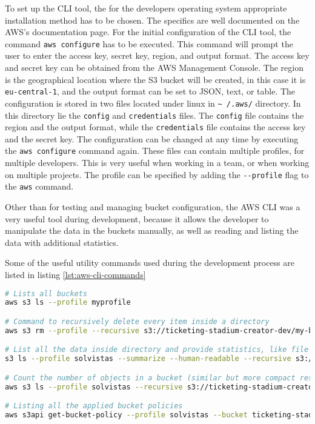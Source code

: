 To set up the CLI tool, the for the developers operating system appropriate installation method has to be chosen. The specifics are well documented on the AWS's documentation page. For the initial configuration of the CLI tool, the command \texttt{aws configure} has to be executed. This command will prompt the user to enter the access key, secret key, region, and output format. The access key and secret key can be obtained from the AWS Management Console. The region is the geographical location where the S3 bucket will be created, in this case it is \texttt{eu-central-1}, and the output format can be set to JSON, text, or table. The configuration is stored in two files located under linux in \texttt{\textasciitilde~/.aws/} directory. In this directory lie the \texttt{config} and \texttt{credentials} files. The \texttt{config} file contains the region and the output format, while the \texttt{credentials} file contains the access key and the secret key. The configuration can be changed at any time by executing the \texttt{aws configure} command again. These files can contain multiple profiles, for multiple developers. This is very useful when working in a team, or when working on multiple projects. The profile can be specified by adding the \texttt{-{}-profile} flag to the \texttt{aws} command. 

Other than for testing and managing bucket configuration, the AWS CLI was a very useful tool during development, because it allows the developer to manipulate the data in the buckets manually, as well as reading and listing the data with additional statistics.

Some of the useful utility commands used during the development process are listed in listing \ref{lst:aws-cli-commands}

\begin{lstlisting}[language=bash, caption={Usefull AWS CLI Commands}, label={lst:aws-cli-commands}]
# Lists all buckets
aws s3 ls --profile myprofile

# Command to recursively delete every item inside a directory
aws s3 rm --profile --recursive s3://ticketing-stadium-creator-dev/my-bucket/

# List all the data inside directory and provide statistics, like file size, object count and tota filesize
s3 ls --profile solvistas --summarize --human-readable --recursive s3://ticketing-stadium-creator-dev/my-bucket

# Count the number of objects in a bucket (similar but more compact results than in the previous command)
aws s3 ls --profile solvistas --recursive s3://ticketing-stadium-creator-dev/ | wc -l

# Listing all the applied bucket policies
aws s3api get-bucket-policy --profile solvistas --bucket ticketing-stadium-creator-dev

\end{lstlisting}

